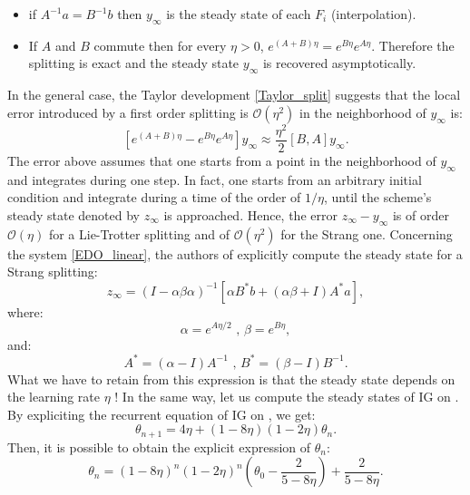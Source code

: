 \documentclass[article,authoryear,jmlmc]{beg_32}             %
\begin{document}
\begin{itemize}
	\item if $A^{-1}a=B^{-1}b$  then $y_{\infty}$ is the steady state of each $F_i$ (interpolation).
	\item If $A$ and $B$ commute then for every $\eta>0$, $e^{(A+B)\eta}=e^{B\eta}e^{A\eta}$. Therefore the splitting is exact and the steady state $y_{\infty}$ is recovered asymptotically. 
\end{itemize}
In the general case, the Taylor development \eqref{Taylor_split} suggests that the local error introduced by a first order splitting is $\mathcal{O}(\eta^2)$ in the neighborhood of $y_{\infty}$ is:
\begin{equation*}
	\left[e^{(A+B)\eta}-e^{B\eta}e^{A\eta}\right]y_{\infty} \approx \frac{\eta^2}{2}\left[B,A\right]y_{\infty}.
\end{equation*}
The error above assumes that one starts from a point in the neighborhood of $y_{\infty}$ and integrates during one step. In fact, one starts from an arbitrary initial condition and
integrate during a time of the order of $1/\eta$, until the scheme's steady state denoted by $z_{\infty}$ is approached. Hence, the error $z_{\infty}-y_{\infty}$ is of order $\mathcal{O}(\eta)$ for a Lie-Trotter splitting and of $\mathcal{O}(\eta^2)$ for the Strang one. Concerning the system \eqref{EDO_linear}, the authors of \cite{rebalanced_splitting} explicitly compute the steady state for a Strang splitting:
\begin{equation*}
	z_{\infty} = (I-\alpha\beta\alpha)^{-1}\left[\alpha B^*b + (\alpha\beta+I)A^*a\right],
\end{equation*}
where:
\begin{equation*}
	\alpha = e^{A\eta/2} \text{ , } \beta = e^{B\eta},
\end{equation*}
and:
\begin{equation*}
	A^* = (\alpha-I)A^{-1} \text{ , } B^* = (\beta-I) B^{-1}.
\end{equation*}
What we have to retain from this expression is that the steady state depends on the learning rate $\eta$ ! In the same way, let us compute the steady states of IG on \exOne. By expliciting the recurrent equation of IG on \exOne, we get:
\begin{equation*}
	\theta_{n+1} = 4\eta + (1-8\eta)(1-2\eta)\theta_n.
\end{equation*} 
Then, it is possible to obtain the explicit expression of $\theta_n$:
\begin{equation*}
	\theta_n = (1-8\eta)^n(1-2\eta)^n\left(\theta_0-\dfrac{2}{5-8\eta}\right) + \dfrac{2}{5-8\eta}.
\end{equation*}
\end{document}
